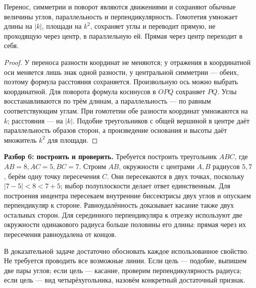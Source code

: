 \begin{theorem}
Перенос, симметрии и поворот являются движениями и сохраняют обычные величины углов, параллельность и перпендикулярность. Гомотетия умножает длины на \(|k|\), площади на \(k^2\), сохраняет углы и переводит прямую, не проходящую через центр, в параллельную ей. Прямая через центр переходит в себя.
\end{theorem}
\begin{proof}У переноса разности координат не меняются; у отражения в координатной оси меняется лишь знак одной разности, у центральной симметрии — обеих, поэтому формула расстояния сохраняется. Произвольную ось можно выбрать координатной. Для поворота формула косинусов в \(OPQ\) сохраняет \(PQ\). Углы восстанавливаются по трём длинам, а параллельность — по равным соответствующим углам. При гомотетии обе разности координат умножаются на \(k\); расстояния — на \(|k|\). Подобие треугольников с общей вершиной в центре даёт параллельность образов сторон, а произведение основания и высоты даёт множитель \(k^2\) для площади.\end{proof}
\begin{example}\textbf{Разбор 6: построить и проверить.} Требуется построить треугольник \(ABC\), где \(AB=8,AC=5,BC=7\). Строим \(AB\), окружности с центрами \(A,B\) радиусов \(5,7\), берём одну точку пересечения \(C\). Они пересекаются в двух точках, поскольку \(|7-5|<8<7+5\); выбор полуплоскости делает ответ единственным. Для построения инцентра пересекаем внутренние биссектрисы двух углов и опускаем перпендикуляр к стороне. Равноудалённость доказывает касание также двух остальных сторон. Для серединного перпендикуляра к отрезку используют две окружности одинакового радиуса больше половины его длины: прямая через их пересечения равноудалена от концов.\end{example}
В доказательной задаче достаточно обосновать каждое использованное свойство. Не требуется проводить все возможные линии. Если цель — подобие, выпишем две пары углов; если цель — касание, проверим перпендикулярность радиуса; если цель — вид четырёхугольника, назовём конкретный достаточный признак.

\relax

